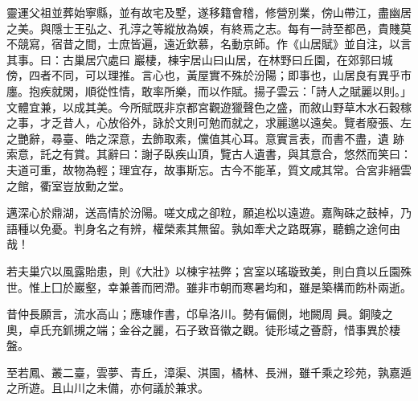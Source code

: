 \begin{pinyinscope}
 靈運父祖並葬始寧縣，並有故宅及墅，遂移籍會稽，修營別業，傍山帶江，盡幽居之美。與隱士王弘之、孔淳之等縱放為娛，有終焉之志。每有一詩至都邑，貴賤莫不競寫，宿昔之間，士庶皆遍，遠近欽慕，名動京師。作《山居賦》並自注，以言其事。曰：古巢居穴處曰
 巖棲，棟宇居山曰山居，在林野曰丘園，在郊郭曰城傍，四者不同，可以理推。言心也，黃屋實不殊於汾陽；即事也，山居良有異乎市廛。抱疾就閑，順從性情，敢率所樂，而以作賦。揚子雲云：「詩人之賦麗以則。」文體宜兼，以成其美。今所賦既非京都宮觀遊獵聲色之盛，而敘山野草木水石穀稼之事，才乏昔人，心放俗外，詠於文則可勉而就之，求麗邈以遠矣。覽者廢張、左之艷辭，尋臺、皓之深意，去飾取素，儻值其心耳。意實言表，而書不盡，遺
 跡索意，託之有賞。其辭曰：謝子臥疾山頂，覽古人遺書，與其意合，悠然而笑曰：夫道可重，故物為輕；理宜存，故事斯忘。古今不能革，質文咸其常。合宮非縉雲之館，衢室豈放勳之堂。


邁深心於鼎湖，送高情於汾陽。嗟文成之卻粒，願追松以遠遊。嘉陶硃之鼓棹，乃語種以免憂。判身名之有辨，權榮素其無留。孰如牽犬之路既寡，聽鶴之途何由哉！


 若夫巢穴以風露貽患，則《大壯》以棟宇袪弊；宮室以瑤璇致美，則白賁以丘園殊世。惟上囗於巖壑，幸兼善而罔滯。雖非市朝而寒暑均和，雖是築構而飭朴兩逝。



 昔仲長願言，流水高山；應璩作書，邙阜洛川。勢有偏側，地闕周
 員。銅陵之奧，卓氏充釽摫之端；金谷之麗，石子致音徽之觀。徒形域之薈蔚，惜事異於棲盤。


至若鳳、叢二臺，雲夢、青丘，漳渠、淇園，橘林、長洲，雖千乘之珍苑，孰嘉遁之所遊。且山川之未備，亦何議於兼求。



\end{pinyinscope}
